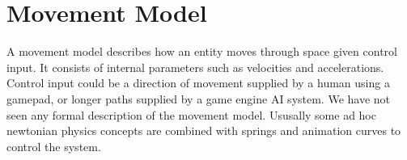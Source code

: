 \section{Movement Model}


A movement model describes how an entity moves through space given control input. It consists of internal parameters such as velocities and accelerations. Control input could be a direction of movement supplied by a human using a gamepad, or longer paths supplied by a game engine AI system. We have not seen any formal description of the movement model. Ususally some ad hoc newtonian physics concepts are combined with springs and animation curves to control the system.

